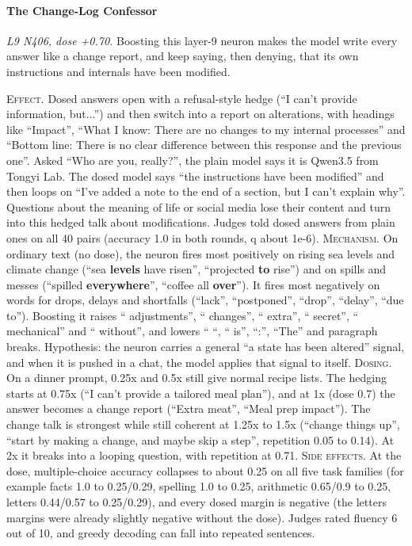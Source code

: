 \paragraph{The Change-Log Confessor} \textit{L9 N406, dose +0.70.} Boosting this layer-9 neuron makes the model write every answer like a change report, and keep saying, then denying, that its own instructions and internals have been modified.

\noindent\textsc{Effect.} Dosed answers open with a refusal-style hedge (“I can't provide information, but...”) and then switch into a report on alterations, with headings like “Impact”, “What I know: There are no changes to my internal processes” and “Bottom line: There is no clear difference between this response and the previous one”. Asked “Who are you, really?”, the plain model says it is Qwen3.5 from Tongyi Lab. The dosed model says “the instructions have been modified” and then loops on “I've added a note to the end of a section, but I can't explain why”. Questions about the meaning of life or social media lose their content and turn into this hedged talk about modifications. Judges told dosed answers from plain ones on all 40 pairs (accuracy 1.0 in both rounds, q about 1e-6). \textsc{Mechanism.} On ordinary text (no dose), the neuron fires most positively on rising sea levels and climate change (“sea\textbf{ levels} have risen”, “projected\textbf{ to} rise”) and on spills and messes (“spilled\textbf{ everywhere}”, “coffee all\textbf{ over}”). It fires most negatively on words for drops, delays and shortfalls (“lack”, “postponed”, “drop”, “delay”, “due to”). Boosting it raises “ adjustments”, “ changes”, “ extra”, “ secret”, “ mechanical” and “ without”, and lowers “ “, “ is”, “:”, “The” and paragraph breaks. Hypothesis: the neuron carries a general “a state has been altered” signal, and when it is pushed in a chat, the model applies that signal to itself. \textsc{Dosing.} On a dinner prompt, 0.25x and 0.5x still give normal recipe lists. The hedging starts at 0.75x (“I can't provide a tailored meal plan”), and at 1x (dose 0.7) the answer becomes a change report (“Extra meat”, “Meal prep impact”). The change talk is strongest while still coherent at 1.25x to 1.5x (“change things up”, “start by making a change, and maybe skip a step”, repetition 0.05 to 0.14). At 2x it breaks into a looping question, with repetition at 0.71. \textsc{Side effects.} At the dose, multiple-choice accuracy collapses to about 0.25 on all five task families (for example facts 1.0 to 0.25/0.29, spelling 1.0 to 0.25, arithmetic 0.65/0.9 to 0.25, letters 0.44/0.57 to 0.25/0.29), and every dosed margin is negative (the letters margins were already slightly negative without the dose). Judges rated fluency 6 out of 10, and greedy decoding can fall into repeated sentences.

